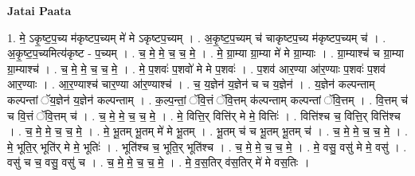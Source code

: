 \documentclass[17pt]{extarticle}
\begin{document}
\textbf{Jatai Paata} \newline

1. मे॒ ऽकृ॒ष्ट॒प॒च्य म॑कृष्टप॒च्यम् मे॑ मे ऽकृष्टप॒च्यम् । . अ॒कृ॒ष्ट॒प॒च्यम् च॑ चाकृष्टप॒च्य म॑कृष्टप॒च्यम् च॑ । . अ॒कृ॒ष्ट॒प॒च्यमित्य॑कृष्ट - प॒च्यम् । . च॒ मे॒ मे॒ च॒ च॒ मे॒ । . मे॒ ग्रा॒म्या ग्रा॒म्या मे॑ मे ग्रा॒म्याः । . ग्रा॒म्याश्च॑ च ग्रा॒म्या ग्रा॒म्याश्च॑ । . च॒ मे॒ मे॒ च॒ च॒ मे॒ । . मे॒ प॒शवः॑ प॒शवो॑ मे मे प॒शवः॑ । . प॒शव॑ आर॒ण्या आ॑र॒ण्याः प॒शवः॑ प॒शव॑ आर॒ण्याः । . आ॒र॒ण्याश्च॑ चार॒ण्या आ॑र॒ण्याश्च॑ । . च॒ य॒ज्ञेन॑ य॒ज्ञेन॑ च च य॒ज्ञेन॑ । . य॒ज्ञेन॑ कल्पन्ताम् कल्पन्तां ॅय॒ज्ञेन॑ य॒ज्ञेन॑ कल्पन्ताम् । . क॒ल्प॒न्तां॒ ॅवि॒त्तं ॅवि॒त्तम् क॑ल्पन्ताम् कल्पन्तां ॅवि॒त्तम् । . वि॒त्तम् च॑ च वि॒त्तं ॅवि॒त्तम् च॑ । . च॒ मे॒ मे॒ च॒ च॒ मे॒ । . मे॒ वित्ति॒र् वित्ति॑र् मे मे॒ वित्तिः॑ । . वित्ति॑श्च च॒ वित्ति॒र् वित्ति॑श्च । . च॒ मे॒ मे॒ च॒ च॒ मे॒ । . मे॒ भू॒तम् भू॒तम् मे॑ मे भू॒तम् । . भू॒तम् च॑ च भू॒तम् भू॒तम् च॑ । . च॒ मे॒ मे॒ च॒ च॒ मे॒ । . मे॒ भूति॒र् भूति॑र् मे मे॒ भूतिः॑ । . भूति॑श्च च॒ भूति॒र् भूति॑श्च । . च॒ मे॒ मे॒ च॒ च॒ मे॒ । . मे॒ वसु॒ वसु॑ मे मे॒ वसु॑ । . वसु॑ च च॒ वसु॒ वसु॑ च । . च॒ मे॒ मे॒ च॒ च॒ मे॒ । . मे॒ व॒स॒तिर् व॑स॒तिर् मे॑ मे वस॒तिः । \newline
\end{document}
